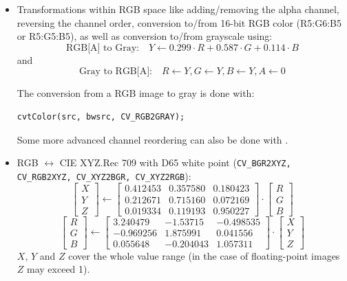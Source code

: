 \begin{itemize}
 \item Transformations within RGB space like adding/removing the alpha channel, reversing the channel order, conversion to/from 16-bit RGB color (R5:G6:B5 or R5:G5:B5), as well as conversion to/from grayscale using:
 \[
 \text{RGB[A] to Gray:}\quad Y \leftarrow 0.299 \cdot R + 0.587 \cdot G + 0.114 \cdot B
 \]
 and
 \[
 \text{Gray to RGB[A]:}\quad R \leftarrow Y, G \leftarrow Y, B \leftarrow Y, A \leftarrow 0
 \]

The conversion from a RGB image to gray is done with:
\begin{lstlisting}
cvtColor(src, bwsrc, CV_RGB2GRAY);
\end{lstlisting}

Some more advanced channel reordering can also be done with .

 \item RGB $\leftrightarrow$ CIE XYZ.Rec 709 with D65 white point (\texttt{CV\_BGR2XYZ, CV\_RGB2XYZ, CV\_XYZ2BGR, CV\_XYZ2RGB}):
 \[
 \begin{bmatrix}
 X \\
 Y \\
 Z
 \end{bmatrix}
 \leftarrow
 \begin{bmatrix}
0.412453 & 0.357580 & 0.180423\\
0.212671 & 0.715160 & 0.072169\\
0.019334 & 0.119193 & 0.950227
 \end{bmatrix}
 \cdot
 \begin{bmatrix}
 R \\
 G \\
 B
 \end{bmatrix}
 \]
 \[
 \begin{bmatrix}
 R \\
 G \\
 B
 \end{bmatrix}
 \leftarrow
 \begin{bmatrix}
3.240479 & -1.53715 & -0.498535\\
-0.969256 &  1.875991 & 0.041556\\
0.055648 & -0.204043 & 1.057311
 \end{bmatrix}
 \cdot
 \begin{bmatrix}
 X \\
 Y \\
 Z
 \end{bmatrix}
 \]
$X$, $Y$ and $Z$ cover the whole value range (in the case of floating-point images $Z$ may exceed 1).


\end{itemize}
